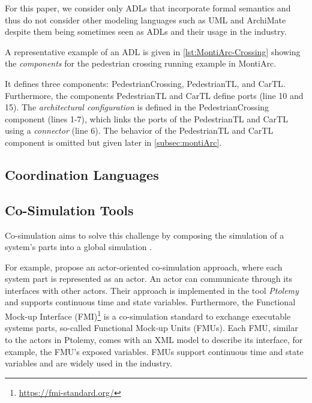\documentclass[runningheads]{llncs}
\begin{document}
For this paper, we consider only ADLs that incorporate formal semantics and thus do not consider other modeling languages such as UML \cite{objectmanagementgroupUnifiedModelingLanguage2017} and ArchiMate \cite{theopengroupArchiMateSpecification2023} despite them being sometimes seen as ADLs and their usage in the industry.

A representative example of an ADL is given in  \autoref{lst:MontiArc-Crossing} showing the \textit{components} for the pedestrian crossing running example in MontiArc.



It defines three components: \textsf{PedestrianCrossing}, \textsf{PedestrianTL}, and \textsf{CarTL}.
Furthermore, the components \textsf{PedestrianTL} and \textsf{CarTL} define ports (line 10 and 15).
The \textit{architectural configuration} is defined in the \textsf{PedestrianCrossing} component (lines 1-7), which links the ports of the \textsf{PedestrianTL} and \textsf{CarTL} using a \textit{connector} (line 6).
The behavior of the \textsf{PedestrianTL} and \textsf{CarTL} component is omitted but given later in \autoref{subsec:montiArc}.

\subsection{Coordination Languages}

\subsection{Co-Simulation Tools}
\cite{gomesCoSimulationSurvey2019}

Co-simulation aims to solve this challenge by composing the simulation of a system's parts into a global simulation \cite{gomesCoSimulationSurvey2019}.

For example, \cite{ekerTamingHeterogeneityPtolemy2003} propose an actor-oriented co-simulation approach, where each system part is represented as an actor.
An actor can communicate through its interfaces with other actors.
Their approach is implemented in the tool \textit{Ptolemy} and supports continuous time and state variables.
Furthermore, the Functional Mock-up Interface (FMI)\footnote{\url{https://fmi-standard.org/}} is a co-simulation standard to exchange executable systems parts, so-called Functional Mock-up Units (FMUs).
Each FMU, similar to the actors in Ptolemy, comes with an XML model to describe its interface, for example, the FMU's exposed variables.
FMUs support continuous time and state variables and are widely used in the industry.
\end{document}
